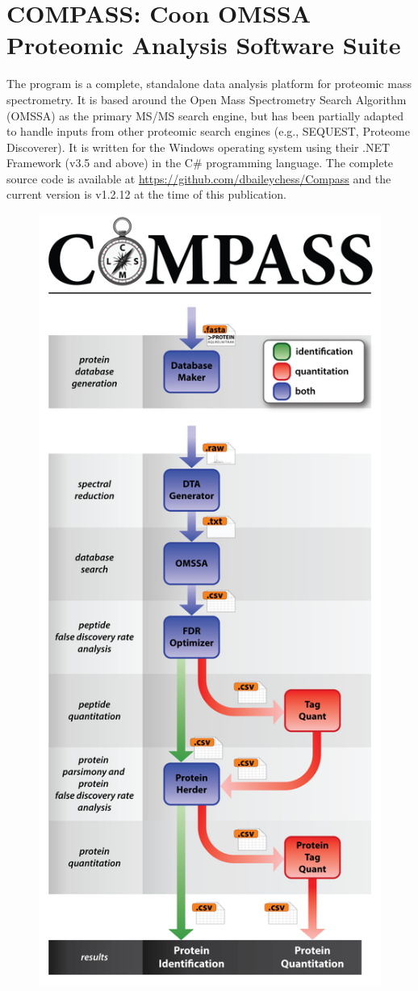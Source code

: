 \section{COMPASS: Coon OMSSA Proteomic Analysis Software Suite}
The \compass{} program is a complete, standalone data analysis platform for proteomic mass spectrometry. It is based around the Open Mass Spectrometry Search Algorithm (OMSSA) as the primary MS/MS search engine, but has been partially adapted to handle inputs from other proteomic search engines (e.g., SEQUEST, Proteome Discoverer).\cite{sequest} It is written for the Windows operating system using their .NET Framework (v3.5 and above) in the C\# programming language. The complete source code is available at \url{https://github.com/dbaileychess/Compass} and the current version is v1.2.12 at the time of this publication.
\begin{figure}[p]
	\centering
	\includegraphics[width=0.5\columnwidth]{csmsl/compass.png}
	\label{fig:compass}
\end{figure}
